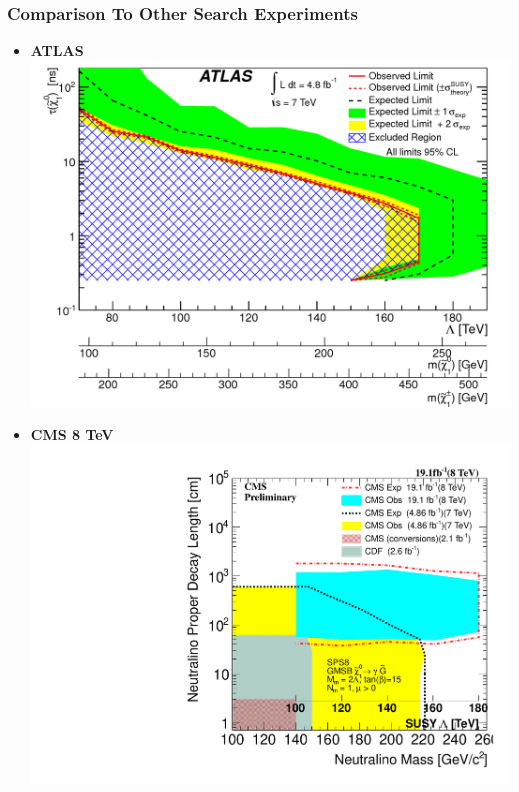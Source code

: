 \documentclass{beamer}
\begin{document}
\begin{frame}
\frametitle{Comparison To Other Search Experiments}
\begin{minipage}[t]{0.82\paperwidth}
 \begin{itemize}
  \item \textcolor{UMN@Maroon}{\textbf{ATLAS}}
  \includegraphics[height=0.35\textwidth,width=0.90\linewidth]{THESISPLOTS/ATLAS_Upper_Limit.png}

 \end{itemize}
\end{minipage}
\begin{minipage}[b]{0.82\paperwidth}
\begin{itemize}
  \item \textcolor{UMN@Maroon}{\textbf{CMS 8 TeV}}
\includegraphics[height=0.35\textwidth,width=0.90\linewidth]{THESISPLOTS/Neutralino_Ctau-Vs-Lambda_2D_exclusion.pdf}

  \end{itemize}
\end{minipage}
\end{frame}
\end{document}

